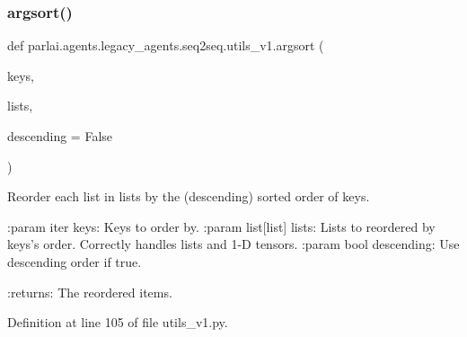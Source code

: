 \subsubsection{\texorpdfstring{argsort()}{argsort()}}
{\footnotesize\ttfamily def parlai.\+agents.\+legacy\+\_\+agents.\+seq2seq.\+utils\+\_\+v1.\+argsort (\begin{DoxyParamCaption}\item[{}]{keys,  }\item[{}]{lists,  }\item[{}]{descending = {\ttfamily False} }\end{DoxyParamCaption})}

\begin{DoxyVerb}Reorder each list in lists by the (descending) sorted order of keys.

:param iter keys: Keys to order by.
:param list[list] lists: Lists to reordered by keys's order.
                         Correctly handles lists and 1-D tensors.
:param bool descending: Use descending order if true.

:returns: The reordered items.
\end{DoxyVerb}
 

Definition at line 105 of file utils\+\_\+v1.\+py.


